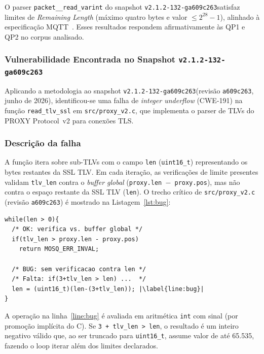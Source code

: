 \documentclass[conference]{IEEEtran}
\newcommand{\mosqsnapshot}{\texttt{v2.1.2-132-ga609c263}}
\begin{document}
O parser \texttt{packet\_\_read\_varint} do snapshot \mosqsnapshot satisfaz
limites de \emph{Remaining Length} (m\'aximo quatro bytes e valor
$\leq 2^{28}-1$), alinhado \`a especifica\c{c}\~ao MQTT~\cite{mqtt_v5_spec}.
Esses resultados respondem afirmativamente \`as QP1 e QP2 no corpus analisado.

\subsubsection{Vulnerabilidade Encontrada no Snapshot \mosqsnapshot}
\label{sec:proxy_v2_vuln}

Aplicando a metodologia ao snapshot \mosqsnapshot (revis\~ao
\texttt{a609c263}, junho de 2026), identificou-se uma falha de
\emph{integer underflow} (CWE-191) na fun\c{c}\~ao \texttt{read\_tlv\_ssl}
em \texttt{src/proxy\_v2.c}, que implementa o parser de TLVs do PROXY
Protocol~v2 para conex\~oes TLS.

\subsubsection*{Descri\c{c}\~ao da falha}
A fun\c{c}\~ao itera sobre sub-TLVs com o campo \texttt{len} (\texttt{uint16\_t})
representando os bytes restantes da SSL TLV. Em cada itera\c{c}\~ao, as
verifica\c{c}\~oes de limite presentes validam \texttt{tlv\_len} contra o
\emph{buffer global} (\texttt{proxy.len~$-$~proxy.pos}), mas n\~ao contra
o espa\c{c}o restante da SSL TLV (\texttt{len}). O trecho cr\'itico de
\texttt{src/proxy\_v2.c} (revis\~ao \texttt{a609c263}) \'e mostrado na
Listagem~\ref{lst:bug}:

\begin{lstlisting}[caption={Trecho vulner\'avel em \texttt{read\_tlv\_ssl} (proxy\_v2.c)},label=lst:bug,escapechar=|]
while(len > 0){
  /* OK: verifica vs. buffer global */
  if(tlv_len > proxy.len - proxy.pos)
    return MOSQ_ERR_INVAL;

  /* BUG: sem verificacao contra len */
  /* Falta: if(3+tlv_len > len) ...  */
  len = (uint16_t)(len-(3+tlv_len)); |\label{line:bug}|
}
\end{lstlisting}

\noindent A opera\c{c}\~ao na linha~\ref{line:bug} \'e avaliada em aritm\'etica
\texttt{int} com sinal (por promo\c{c}\~ao impl\'icita do C). Se
\texttt{3~+~tlv\_len~>~len}, o resultado \'e um inteiro
negativo v\'alido que, ao ser truncado para \texttt{uint16\_t}, assume valor
de at\'e 65.535, fazendo o loop iterar al\'em dos limites declarados.
\end{document}
